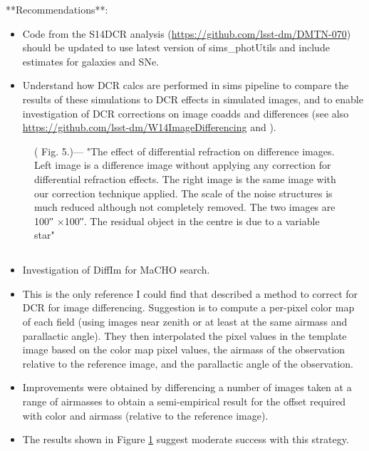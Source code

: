 \documentclass[DM,authoryear,toc]{lsstdoc}
\begin{document}
**Recommendations**:
\begin{itemize}
	\item Code from the S14DCR analysis
          (\url{https://github.com/lsst-dm/DMTN-070}) should be updated to
          use latest version of sims\_photUtils and include estimates
          for galaxies and SNe.
	\item Understand how DCR calcs are performed in sims pipeline
          to compare the results of these simulations to DCR effects
          in simulated images, and to enable investigation of DCR
          corrections on image coadds and differences (see also
          \url{https://github.com/lsst-dm/W14ImageDifferencing} and ).
\end{itemize}


\begin{figure}[t!]
	\begin{center}
		\caption{(\citeauthor{1999ApJ...521..602A} Fig. 5.)— "The effect of differential refraction on difference images. Left image is a difference image without applying any correction for differential refraction effects. The right image is the same image with our correction technique applied. The scale of the noise structures is much reduced although not completely removed. The two images are 100′′ ×100′′. The residual object in the centre is due to a variable star"}
		\label{Fig:Alcock5}
	\end{center}
\end{figure}


\subsection{\cite{1999ApJ...521..602A}}
\begin{itemize}
	\item Investigation of DiffIm for MaCHO search.
	\item This is the only reference I could find that described a method
	to correct for DCR for image differencing. Suggestion is to compute a
	per-pixel color map of each field (using images near zenith or at
	least at the same airmass and parallactic angle). They then
	interpolated the pixel values in the template image based on the
	color map pixel values, the airmass of the observation relative to
	the reference image, and the parallactic angle of the observation.
	\item Improvements were obtained by differencing a number of images
	taken at a range of airmasses to obtain a semi-empirical result for
	the offset required with color and airmass (relative to the
	reference image).
	\item The results shown in Figure \ref{Fig:Alcock5} suggest moderate success with this
	strategy.
\end{itemize}
\end{document}
